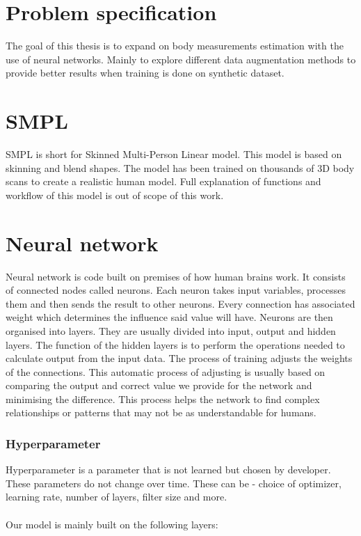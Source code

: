 \section{Problem specification}
The goal of this thesis is to expand on body measurements estimation with the use of neural networks. Mainly to explore different data augmentation methods to provide better results when training is done on synthetic dataset.


\section{SMPL}
SMPL is short for Skinned Multi-Person Linear model. This model is based on skinning and blend shapes. The model has been trained on thousands of 3D body scans to create a realistic human model. Full explanation of functions and workflow of this model is out of scope of this work.


\section{Neural network}
Neural network is code built on premises of how human brains work. It consists of connected nodes called neurons. Each neuron takes input variables, processes them and then sends the result to other neurons. Every connection has associated weight which determines the influence said value will have.
Neurons are then organised into layers. They are usually divided into input, output and hidden layers. The function of the hidden layers is to perform the operations needed to calculate output from the input data.
The process of training adjusts the weights of the connections. This automatic process of adjusting is usually based on comparing the output and correct value we provide for the network and minimising the difference.
This process helps the network to find complex relationships or patterns that may not  be as understandable for humans.

\subsubsection{Hyperparameter}
Hyperparameter is a parameter that is not learned but chosen by developer.  These parameters do not change over time. These can be - choice of optimizer, learning rate,  number of layers, filter size and more.\\\\
Our model is mainly built on the following layers:

